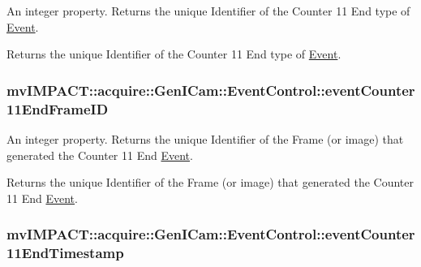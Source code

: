 An integer property. Returns the unique Identifier of the Counter 11 End type of \hyperlink{classmv_i_m_p_a_c_t_1_1acquire_1_1_event}{Event}. 

Returns the unique Identifier of the Counter 11 End type of \hyperlink{classmv_i_m_p_a_c_t_1_1acquire_1_1_event}{Event}. \hypertarget{classmv_i_m_p_a_c_t_1_1acquire_1_1_gen_i_cam_1_1_event_control_a4ec3d07be49576c3ad03cb7a94d2325f}{
\subsubsection[{event\+Counter11\+End\+Frame\+I\+D}]{ mv\+I\+M\+P\+A\+C\+T\+::acquire\+::\+Gen\+I\+Cam\+::\+Event\+Control\+::event\+Counter11\+End\+Frame\+I\+D}}\label{classmv_i_m_p_a_c_t_1_1acquire_1_1_gen_i_cam_1_1_event_control_a4ec3d07be49576c3ad03cb7a94d2325f}


An integer property. Returns the unique Identifier of the Frame (or image) that generated the Counter 11 End \hyperlink{classmv_i_m_p_a_c_t_1_1acquire_1_1_event}{Event}. 

Returns the unique Identifier of the Frame (or image) that generated the Counter 11 End \hyperlink{classmv_i_m_p_a_c_t_1_1acquire_1_1_event}{Event}. \hypertarget{classmv_i_m_p_a_c_t_1_1acquire_1_1_gen_i_cam_1_1_event_control_a6f5901c40c67adb66b1b41c82fcbc633}{
\subsubsection[{event\+Counter11\+End\+Timestamp}]{ mv\+I\+M\+P\+A\+C\+T\+::acquire\+::\+Gen\+I\+Cam\+::\+Event\+Control\+::event\+Counter11\+End\+Timestamp}}\label{classmv_i_m_p_a_c_t_1_1acquire_1_1_gen_i_cam_1_1_event_control_a6f5901c40c67adb66b1b41c82fcbc633}


